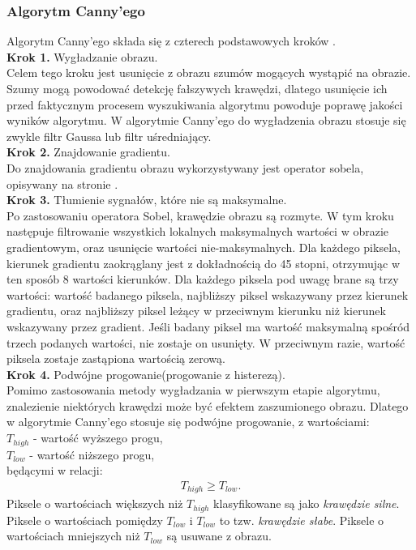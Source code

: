 \subsubsection{Algorytm Canny'ego}
Algorytm Canny'ego składa się z czterech podstawowych kroków \cite{canny86}.\\
\textbf{Krok 1.} Wygładzanie obrazu. \\
  Celem tego kroku jest usunięcie z obrazu szumów mogących wystąpić na obrazie. Szumy mogą powodować detekcję fałszywych krawędzi, dlatego usunięcie ich przed faktycznym procesem wyszukiwania algorytmu powoduje poprawę jakości wyników algorytmu. W algorytmie Canny'ego do wygładzenia obrazu stosuje się zwykle filtr Gaussa lub filtr uśredniający. \\
\textbf{Krok 2.} Znajdowanie gradientu. \\
Do znajdowania gradientu obrazu wykorzystywany jest operator sobela, opisywany na stronie \pageref{sssec:sobel}.\\
\textbf{Krok 3.} Tłumienie sygnałów, które nie są maksymalne. \\
Po zastosowaniu operatora Sobel, krawędzie obrazu są rozmyte. W tym kroku następuje filtrowanie wszystkich lokalnych maksymalnych wartości w obrazie gradientowym, oraz usunięcie wartości nie-maksymalnych. Dla każdego piksela, kierunek gradientu zaokrąglany jest z dokładnością do 45 stopni, otrzymując w ten sposób 8 wartości kierunków. Dla każdego piksela pod uwagę brane są trzy wartości: wartość badanego piksela, najbliższy piksel wskazywany przez kierunek gradientu, oraz najbliższy piksel leżący w przeciwnym kierunku niż kierunek wskazywany przez gradient. Jeśli badany piksel ma wartość maksymalną spośród trzech podanych wartości, nie zostaje on usunięty. W przeciwnym razie, wartość piksela zostaje zastąpiona wartością zerową.\\
\textbf{Krok 4.} Podwójne progowanie(progowanie z histerezą).\\
  Pomimo zastosowania metody wygładzania w pierwszym etapie algorytmu, znalezienie niektórych krawędzi może być efektem zaszumionego obrazu. Dlatego w algorytmie Canny'ego stosuje się podwójne progowanie, z wartościami:\\
$T_{high}$ - wartość wyższego progu,\\
$T_{low}$ - wartość niższego progu,\\
będącymi w relacji:
\begin{gather*}
  T_{high} \geq T_{low}.
\end{gather*}
Piksele o wartościach większych niż $T_{high}$ klasyfikowane są jako \textit{krawędzie silne}. Piksele o wartościach pomiędzy $T_{low}$ i $T_{low}$ to tzw. \textit{krawędzie słabe}. Piksele o wartościach mniejszych niż $T_{low}$ są usuwane z obrazu.

